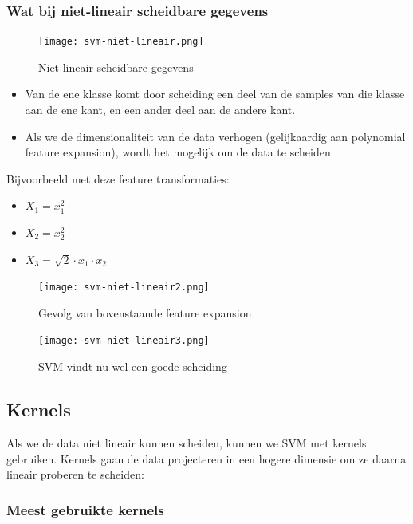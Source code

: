 \documentclass{article}
\begin{document}
\subsubsection{Wat bij niet-lineair scheidbare gegevens}

\begin{figure}[H]
    \centering
    \texttt{[image: svm-niet-lineair.png]}
    \caption{Niet-lineair scheidbare gegevens}
\end{figure}

\begin{itemize}
    \item Van de ene klasse komt door scheiding een deel van de samples van die klasse aan de ene kant, en een ander deel aan de andere kant.
    \item Als we de dimensionaliteit van de data verhogen (gelijkaardig aan polynomial feature expansion), wordt het mogelijk om de data te scheiden
\end{itemize}

Bijvoorbeeld met deze feature transformaties:

\begin{itemize}
    \item $X_1 = x_1^2$
    \item $X_2 = x_2^2$
    \item $X_3= \sqrt{2}\cdot x_1 \cdot x_2$
\end{itemize}

\begin{figure}[H]
    \centering
    \texttt{[image: svm-niet-lineair2.png]}
    \caption{Gevolg van bovenstaande feature expansion}
\end{figure}


\begin{figure}[H]
    \centering
    \texttt{[image: svm-niet-lineair3.png]}
    \caption{SVM vindt nu wel een goede scheiding}
\end{figure}

\subsection{Kernels}

Als we de data niet lineair kunnen scheiden, kunnen we SVM met kernels gebruiken.
Kernels gaan de data projecteren in een hogere dimensie om ze daarna lineair proberen te scheiden:

\subsubsection{Meest gebruikte kernels}
\end{document}
